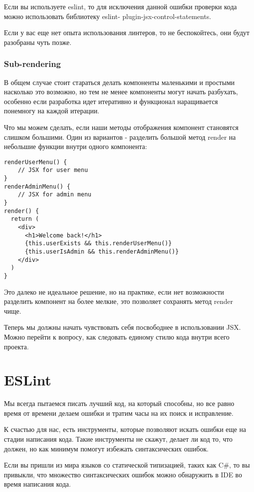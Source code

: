 Если вы используете eslint, то для исключения данной ошибки проверки кода можно использовать библиотеку eslint- plugin-jsx-control-statements.

Если у вас еще нет опыта использования линтеров, то не беспокойтесь, они будут разобраны чуть позже. 

\subsubsection{Sub-rendering}

В общем случае стоит стараться делать компоненты маленькими и простыми насколько это возможно, но тем не менее компоненты могут начать разбухать, особенно если разработка идет итеративно и функционал наращивается понемногу на каждой итерации.

Что мы можем сделать, если наши методы отображения компонент становятся слишком большими. Один из вариантов - разделить большой метод render на небольшие функции внутри одного компонента:

\begin{lstlisting}
renderUserMenu() {
    // JSX for user menu
}
renderAdminMenu() {
    // JSX for admin menu
}
render() {
  return (
    <div>
      <h1>Welcome back!</h1>
      {this.userExists && this.renderUserMenu()}
      {this.userIsAdmin && this.renderAdminMenu()}
    </div> 
  )
}
\end{lstlisting}

Это далеко не идеальное решение, но на практике, если нет возможности разделить компонент на более мелкие, это позволяет сохранять метод render чище.

Теперь мы должны начать чувствовать себя посвободнее в использовании JSX. Можно перейти к вопросу, как следовать единому стилю кода внутри всего проекта.

\section{ESLint}

Мы всегда пытаемся писать лучший код, на который способны, но все равно время от времени делаем ошибки и тратим часы на их поиск и исправление.

К счастью для нас, есть инструменты, которые позволяют искать ошибки еще на стадии написания кода. Такие инструменты не скажут, делает ли код то, что должен, но как минимум помогут избежать синтаксических ошибок.

Если вы пришли из мира языков со статической типизацией, таких как C\#, то вы привыкли, что множество синтаксических ошибок можно обнаружить в IDE во время написания кода.

